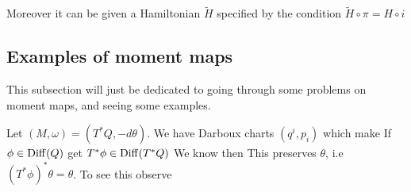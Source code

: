 \documentclass{article}
\begin{document}
Moreover it can be given a Hamiltonian $\tilde{H}$ specified by the condition $\tilde{H}\circ \pi = H \circ i $


\subsection{Examples of moment maps}
This subsection will just be dedicated to going through some problems on moment maps, and seeing some examples. 

\begin{example}
Let $(M, \omega) = (T^\ast Q, - d\theta)$. We have Darboux charts $(q^i,p_i)$ which make 
If $\phi \in \operatorname{Diff}(Q)$ get $T^\ast \phi \in \operatorname{Diff}(T^\ast Q)$
We know 
then 
This preserves $\theta$, i.e $(T^\ast \phi)^\ast \theta = \theta$. To see this observe 


\end{example}
\end{document}
